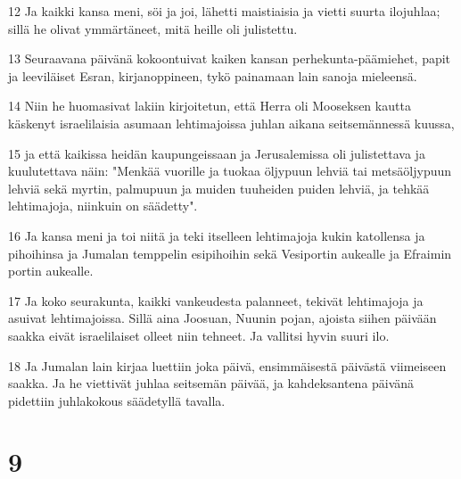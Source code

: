 \par 12 Ja kaikki kansa meni, söi ja joi, lähetti maistiaisia ja vietti suurta ilojuhlaa; sillä he olivat ymmärtäneet, mitä heille oli julistettu.
\par 13 Seuraavana päivänä kokoontuivat kaiken kansan perhekunta-päämiehet, papit ja leeviläiset Esran, kirjanoppineen, tykö painamaan lain sanoja mieleensä.
\par 14 Niin he huomasivat lakiin kirjoitetun, että Herra oli Mooseksen kautta käskenyt israelilaisia asumaan lehtimajoissa juhlan aikana seitsemännessä kuussa,
\par 15 ja että kaikissa heidän kaupungeissaan ja Jerusalemissa oli julistettava ja kuulutettava näin: "Menkää vuorille ja tuokaa öljypuun lehviä tai metsäöljypuun lehviä sekä myrtin, palmupuun ja muiden tuuheiden puiden lehviä, ja tehkää lehtimajoja, niinkuin on säädetty".
\par 16 Ja kansa meni ja toi niitä ja teki itselleen lehtimajoja kukin katollensa ja pihoihinsa ja Jumalan temppelin esipihoihin sekä Vesiportin aukealle ja Efraimin portin aukealle.
\par 17 Ja koko seurakunta, kaikki vankeudesta palanneet, tekivät lehtimajoja ja asuivat lehtimajoissa. Sillä aina Joosuan, Nuunin pojan, ajoista siihen päivään saakka eivät israelilaiset olleet niin tehneet. Ja vallitsi hyvin suuri ilo.
\par 18 Ja Jumalan lain kirjaa luettiin joka päivä, ensimmäisestä päivästä viimeiseen saakka. Ja he viettivät juhlaa seitsemän päivää, ja kahdeksantena päivänä pidettiin juhlakokous säädetyllä tavalla.

\chapter{9}

